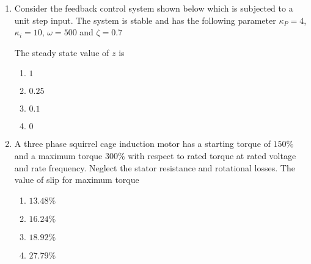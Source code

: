 \documentclass[journal]{IEEEtran}
\numberwithin{equation}{enumi}
\numberwithin{figure}{enumi}
\begin{document}
\begin{enumerate}
    \item 
    Consider the feedback control system shown below which is subjected to a unit step input. The system is stable and has the following parameter $\kappa_P = 4$, $\kappa_i = 10$, $\omega = 500$ and $\zeta = 0.7$

    \begin{figure}[H]
    \centering
    \resizebox{1\textwidth}{!}{}
    \end{figure}

    The steady state value of $z$ is

    \begin{multicols}{4}
        \begin{enumerate}
            \item $1$
            \item $0.25$
            \item $0.1$
            \item $0$
        \end{enumerate}
    \end{multicols}

    \item 
    A three phase squirrel cage induction motor has a starting torque of $150\%$ and a maximum torque $300\%$ with respect to rated torque at rated voltage and rate frequency. Neglect the stator resistance and rotational losses. The value of slip for maximum torque

    \begin{multicols}{4}
        \begin{enumerate}
            \item $13.48\%$
            \item $16.24\%$
            \item $18.92\%$
            \item $27.79\%$
        \end{enumerate}
    \end{multicols}


\end{enumerate}
\end{document}

